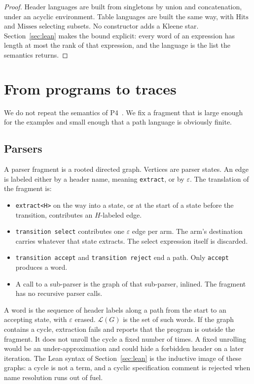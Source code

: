 \documentclass[a4paper,UKenglish,cleveref,autoref]{lipics-v2021}
\begin{document}
\begin{proof}
Header languages are built from singletons by union and concatenation, under an acyclic environment.
Table languages are built the same way, with \(\mathrm{Hits}\) and \(\mathrm{Misses}\) selecting subsets.
No constructor adds a Kleene star.
Section~\ref{sec:lean} makes the bound explicit: every word of an expression has length at most the rank of that expression, and the language is the list the semantics returns.
\end{proof}

\section{From programs to traces}
\label{sec:extract}

We do not repeat the semantics of P4~\cite{p4langspec,petr4}.
We fix a fragment that is large enough for the examples and small enough that a path language is obviously finite.

\subsection{Parsers}

A parser fragment is a rooted directed graph.
Vertices are parser states.
An edge is labeled either by a header name, meaning \texttt{extract}, or by \(\varepsilon\).
The translation of the fragment is:
\begin{itemize}
\item \texttt{extract<H>} on the way into a state, or at the start of a state before the transition, contributes an \(H\)-labeled edge.
\item \texttt{transition select} contributes one \(\varepsilon\) edge per arm.
  The arm's destination carries whatever that state extracts.
  The select expression itself is discarded.
\item \texttt{transition accept} and \texttt{transition reject} end a path.
  Only \texttt{accept} produces a word.
\item A call to a sub-parser is the graph of that sub-parser, inlined.
  The fragment has no recursive parser calls.
\end{itemize}
A word is the sequence of header labels along a path from the start to an accepting state, with \(\varepsilon\) erased.
\(\mathcal{L}(G)\) is the set of such words.
If the graph contains a cycle, extraction fails and reports that the program is outside the fragment.
It does not unroll the cycle a fixed number of times.
A fixed unrolling would be an under-approximation and could hide a forbidden header on a later iteration.
The Lean syntax of Section~\ref{sec:lean} is the inductive image of these graphs: a cycle is not a term, and a cyclic specification comment is rejected when name resolution runs out of fuel.
\end{document}

